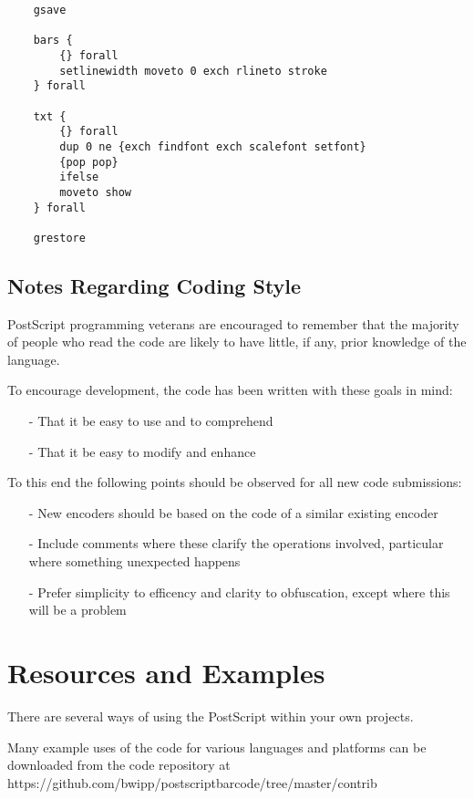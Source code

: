\documentclass []{article}
\begin{document}
\begin{verbatim}
    gsave
    
    bars {
        {} forall
        setlinewidth moveto 0 exch rlineto stroke
    } forall
    
    txt {
        {} forall
        dup 0 ne {exch findfont exch scalefont setfont} 
        {pop pop} 
        ifelse
        moveto show
    } forall

    grestore
\end{verbatim}

\subsection{Notes Regarding Coding Style}

PostScript programming veterans are encouraged to remember that the
majority of people who read the code are likely to have little,
if any, prior knowledge of the language.

To encourage development, the code has been written with these
goals in mind:

\begin{itemize}
\item[-]{That it be easy to use and to comprehend}
\item[-]{That it be easy to modify and enhance}
\end{itemize}

To this end the following points should be observed for all new
code submissions:

\begin{itemize}
\item[-]{New encoders should be based on the code of a similar
existing encoder}
\item[-]{Include comments where these clarify the operations 
involved, particular where something unexpected happens}
\item[-]{Prefer simplicity to efficency and clarity to
obfuscation, except where this will be a problem}
\end{itemize}

\newpage

\section{Resources and Examples}

There are several ways of using the PostScript within your own
projects.

Many example uses of the code for various languages and platforms
can be downloaded from the code repository at \mbox{https://github.com/bwipp/postscriptbarcode/tree/master/contrib}
\end{document}
